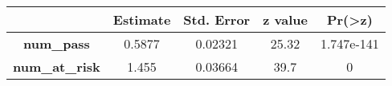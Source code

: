 \documentclass[]{book}
\theoremstyle{definition}
\theoremstyle{definition}
\theoremstyle{remark}
\begin{document}
\begin{longtable}[]{@{}ccccc@{}}
\toprule
\begin{minipage}[b]{0.30\columnwidth}\centering\strut
~\strut
\end{minipage} & \begin{minipage}[b]{0.13\columnwidth}\centering\strut
Estimate\strut
\end{minipage} & \begin{minipage}[b]{0.16\columnwidth}\centering\strut
Std. Error\strut
\end{minipage} & \begin{minipage}[b]{0.12\columnwidth}\centering\strut
z value\strut
\end{minipage} & \begin{minipage}[b]{0.12\columnwidth}\centering\strut
Pr(\textgreater{}\textbar{}z\textbar{})\strut
\end{minipage}\tabularnewline
\midrule
\endhead
\begin{minipage}[t]{0.30\columnwidth}\centering\strut
\textbf{num\_pass}\strut
\end{minipage} & \begin{minipage}[t]{0.13\columnwidth}\centering\strut
0.5877\strut
\end{minipage} & \begin{minipage}[t]{0.16\columnwidth}\centering\strut
0.02321\strut
\end{minipage} & \begin{minipage}[t]{0.12\columnwidth}\centering\strut
25.32\strut
\end{minipage} & \begin{minipage}[t]{0.12\columnwidth}\centering\strut
1.747e-141\strut
\end{minipage}\tabularnewline
\begin{minipage}[t]{0.30\columnwidth}\centering\strut
\textbf{num\_at\_risk}\strut
\end{minipage} & \begin{minipage}[t]{0.13\columnwidth}\centering\strut
1.455\strut
\end{minipage} & \begin{minipage}[t]{0.16\columnwidth}\centering\strut
0.03664\strut
\end{minipage} & \begin{minipage}[t]{0.12\columnwidth}\centering\strut
39.7\strut
\end{minipage} & \begin{minipage}[t]{0.12\columnwidth}\centering\strut
0\strut
\end{minipage}\tabularnewline

\end{longtable}
\end{document}
